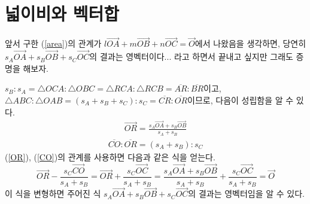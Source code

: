 \documentclass{scrartcl}
\newcommand{\Seg}[1]{\overline{#1}}
\newcommand{\Ray}[1]{\overrightarrow{#1}}
\begin{document}
\section{넓이비와 벡터합}
앞서 구한 (\ref{area})의 관계가 \(l\Ray{OA}+m\Ray{OB}+n\Ray{OC}=\Ray{O}\)에서 나왔음을 생각하면, 당연히 \(s_A \Ray{OA}+s_B \Ray{OB}+s_C \Ray{OC}\)의 결과는 영벡터이다... 라고 하면서 끝내고 싶지만 그래도 증명을 해보자.

\(s_B:s_A=\triangle OCA:\triangle OBC=\triangle RCA:\triangle RCB=\Seg{AR}:\Seg{BR}\)이고, \(\triangle ABC:\triangle OAB=(s_A+s_B+s_C):s_C=\Seg{CR}:\Seg{OR}\)이므로, 다음이 성립함을 알 수 있다.
\begin{align}\label{OR}\Ray{OR}=\frac{s_A\Ray{OA}+s_B\Ray{OB}}{s_A+s_B}\end{align}
\begin{align}\label{CO}\Seg{CO}:\Seg{OR}=(s_A+s_B):s_C\end{align}
(\ref{OR}), (\ref{CO})의 관계를 사용하면 다음과 같은 식을 얻는다.
\[\Ray{OR}-\frac{s_C\Ray{CO}}{s_A+s_B}=\Ray{OR}+\frac{s_C\Ray{OC}}{s_A+s_B}=\frac{s_A\Ray{OA}+s_B\Ray{OB}}{s_A+s_B}+\frac{s_C\Ray{OC}}{s_A+s_B}=\Ray{O}\]
이 식을 변형하면 주어진 식 \(s_A \Ray{OA}+s_B \Ray{OB}+s_C \Ray{OC}\)의 결과는 영벡터임을 알 수 있다.
\end{document}
